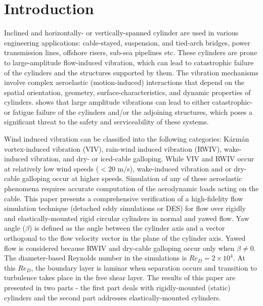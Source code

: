 \section{Introduction}
\label{sec:intro}
%
Inclined and horizontally- or vertically-spanned cylinder are used in various
engineering applications: cable-stayed, suspension, and tied-arch bridges,
power transmission lines, offshore risers, sub-sea pipelines etc. These
cylinders are prone to large-amplitude flow-induced vibration, which can lead
to catastrophic failure of the cylinders and the structures supported by them.
The vibration mechanisms involve complex aeroelastic (motion-induced)
interactions that depend on the spatial orientation, geometry,
surface-characteristics, and dynamic properties of
cylinders. \cite{davenport1995dynamics} shows that large amplitude vibrations
can lead to either catastrophic- or fatigue failure of the cylinders and/or the
adjoining structures, which poses a significant threat to the safety and
serviceability of these systems.

Wind induced vibration can be classified into the following categories:
K\'arm\'an vortex-induced vibration (VIV), rain-wind induced vibration (RWIV),
wake-induced vibration, and dry- or iced-cable galloping. While VIV and RWIV
occur at relatively low wind speeds ($<20$ m/s), wake-induced vibration and or
dry-cable galloping occur at higher speeds. Simulation of any of these
aeroelastic phenomena requires accurate computation of the aerodynamic loads
acting on the cable.  This paper presents a comprehensive verification of a
high-fidelity flow simulation technique (detached eddy simulations or DES) for
flow over rigidly and elastically-mounted rigid circular cylinders in normal
and yawed flow. Yaw angle ($\beta$) is defined as the angle between the
cylinder axis and a vector orthogonal to the flow velocity vector in the plane
of the cylinder axis.  Yawed flow is considered because RWIV and dry-cable
galloping occur only when $\beta \ne 0$. The diameter-based Reynolds number in
the simulations is $Re_D=2\times 10^4$. At this $Re_D$, the boundary layer is
laminar when separation occurs and transition to turbulence takes place in the
free shear layer. The results of this paper are presented in two parts - the
first part deals with rigidly-mounted (static) cylinders and the second part
addresses elastically-mounted cylinders.

